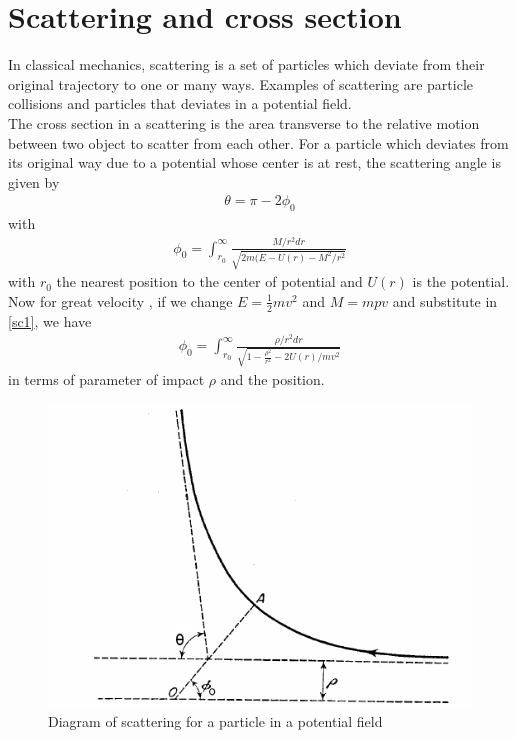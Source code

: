 
\chapter{Scattering and cross section}
In classical mechanics, scattering is  a set of particles which deviate from their original trajectory to one or many ways. Examples of scattering are particle collisions and particles that deviates in a potential field.\\  
The cross section in a scattering is the area transverse to the relative motion between two object to scatter from each other.\cite{goldstein}
For a particle which deviates from its original way due to a potential whose center is at rest, the scattering angle is given by
\begin{align}
    \theta =\pi - 2\phi_0
\end{align}
with 
\begin{align}\label{sc1}
\phi_0 = \int_{r_0}^\infty \frac{M/r^2 d r}{\sqrt{2m(E-U(r)-M^2/r^2}}
\end{align}
with $r_0$ the nearest position to the center of potential and $U(r)$ is the potential. Now for great velocity , if we change $E=\frac{1}{2}mv^2$ and  $M=mpv$ and substitute in \ref{sc1}, we have \begin{align}
    \phi_0 = \int_{r_0}^\infty \frac{\rho /r^2 d r}{\sqrt{1-\frac{\rho^2}{r^2}-2U(r)/mv^2}}
\end{align} 
in terms of parameter of impact $\rho$ and the position\cite{landau}.
\begin{figure}[ht!] 
    \centering
    \includegraphics[scale=0.8]{Chapter1/sc.png}
    \caption{Diagram of scattering for a particle in a potential field\cite{landau}}
    \label{sc2}
\end{figure}
